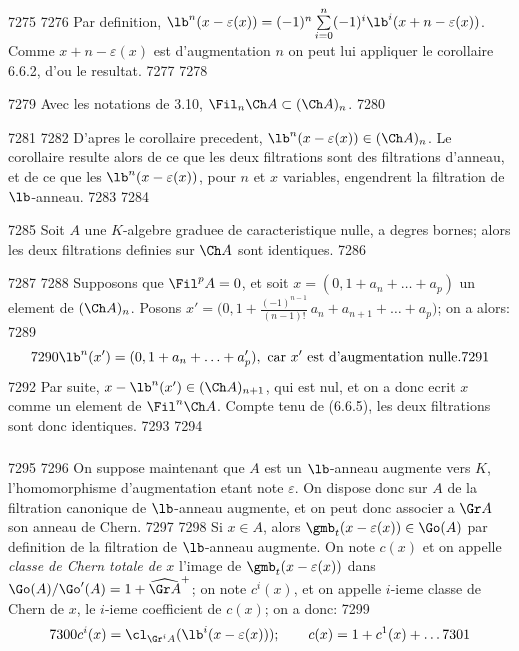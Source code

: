   7275	
  7276	Par definition, $\lb^n(x-\varepsilon(x)) = (-1)^n \sum\limits_{i=0}^{n} (-1)^i \lb^i(x+n-\varepsilon(x))$. Comme $x+n-\varepsilon(x)$ est d'augmentation $n$ on peut lui appliquer le corollaire 6.6.2, d'ou le resultat.
  7277	
  7278	\begin{cor}[6.6.5]
  7279	Avec les notations de 3.10, $\Fil_n \Ch A \subset (\Ch A)_n$.
  7280	\end{cor}
  7281	
  7282	D'apres le corollaire precedent, $\lb^n(x-\varepsilon(x)) \in (\Ch A)_n$. Le corollaire resulte alors de ce que les deux filtrations sont des filtrations d'anneau, et de ce que les $\lb^n(x-\varepsilon(x))$, pour $n$ et $x$ variables, engendrent la filtration de $\lb$-anneau.
  7283	
  7284	\begin{cor}[6.6.7]
  7285	Soit $A$ une $K$-algebre graduee de caracteristique nulle, a degres bornes; alors les deux filtrations definies sur $\Ch A$ sont identiques.
  7286	\end{cor}
  7287	
  7288	Supposons que $\Fil^p A = 0$, et soit $x = (0, 1+a_n+\ldots+a_p)$ un element de $(\Ch A)_n$. Posons $x' = \bigl(0, 1+\frac{(-1)^{n-1}}{(n-1)!}\, a_n + a_{n+1} + \ldots + a_p\bigr)$; on a alors:
  7289	\[
  7290	\lb^n(x') = (0, 1+a_n+\ldots+a'_p), \text{ car } x' \text{ est d'augmentation nulle.}
  7291	\]
  7292	Par suite, $x - \lb^n(x') \in (\Ch A)_{n+1}$, qui est nul, et on a donc ecrit $x$ comme un element de $\Fil^n \Ch A$. Compte tenu de (6.6.5), les deux filtrations sont donc identiques.
  7293	
  7294	\subsubsection{}
  7295	
  7296	On suppose maintenant que $A$ est un $\lb$-anneau augmente vers $K$, l'homomorphisme d'augmentation etant note $\varepsilon$. On dispose donc sur $A$ de la filtration canonique de $\lb$-anneau augmente, et on peut donc associer a $\Gr A$ son anneau de Chern.
  7297	
  7298	Si $x \in A$, alors $\gmb_t(x-\varepsilon(x)) \in \Go(A)$ par definition de la filtration de $\lb$-anneau augmente. On note $c(x)$ et on appelle \emph{classe de Chern totale de $x$} l'image de $\gmb_t(x-\varepsilon(x))$ dans $\Go(A)/\Go'(A) = 1 + \widehat{\Gr A}^+$; on note $c^i(x)$, et on appelle $i$-ieme classe de Chern de $x$, le $i$-ieme coefficient de $c(x)$; on a donc:
  7299	\begin{equation}\label{eq:6.7.1}
  7300	c^i(x) = \cl_{\Gr^i A}(\lb^i(x-\varepsilon(x))); \qquad c(x) = 1 + c^1(x) + \ldots
  7301	\end{equation}
